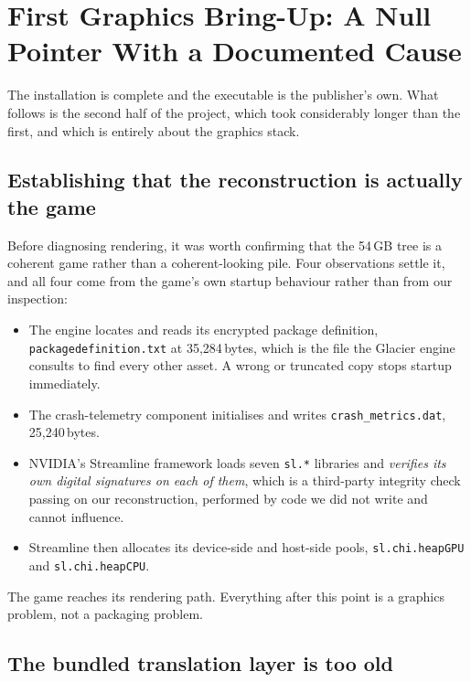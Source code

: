 \section{First Graphics Bring-Up: A Null Pointer With a Documented Cause}
\label{sec:graphics1}

The installation is complete and the executable is the publisher's own. What
follows is the second half of the project, which took considerably longer than
the first, and which is entirely about the graphics stack.

\subsection{Establishing that the reconstruction is actually the game}

Before diagnosing rendering, it was worth confirming that the 54\,GB tree is a
coherent game rather than a coherent-looking pile. Four observations settle it,
and all four come from the game's own startup behaviour rather than from our
inspection:

\begin{itemize}
\item The engine locates and reads its encrypted package definition,
      \verb|packagedefinition.txt| at 35{,}284\,bytes, which is the file the
      Glacier engine consults to find every other asset. A wrong or truncated
      copy stops startup immediately.
\item The crash-telemetry component initialises and writes
      \verb|crash_metrics.dat|, 25{,}240\,bytes.
\item NVIDIA's Streamline framework loads seven \verb|sl.*| libraries and
      \emph{verifies its own digital signatures on each of them}, which is a
      third-party integrity check passing on our reconstruction, performed by
      code we did not write and cannot influence.
\item Streamline then allocates its device-side and host-side pools,
      \verb|sl.chi.heapGPU| and \verb|sl.chi.heapCPU|.
\end{itemize}

The game reaches its rendering path. Everything after this point is a graphics
problem, not a packaging problem.

\subsection{The bundled translation layer is too old}

